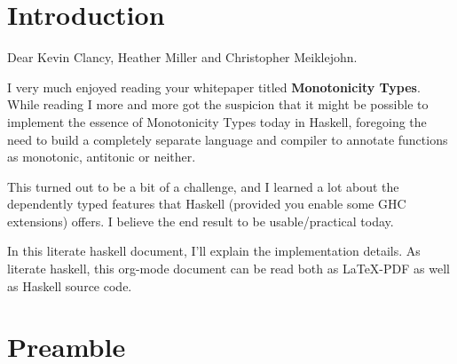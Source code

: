 \documentclass[11pt]{article}
\author{Wiebe-Marten Wijnja}
\date{\today}
\title{}
\begin{document}
\tableofcontents


\section{Introduction}
\label{sec:orgd0d5509}

Dear Kevin Clancy, Heather Miller and Christopher Meiklejohn.

I very much enjoyed reading your whitepaper titled \textbf{Monotonicity Types}.
While reading I more and more got the suspicion that it might be possible to implement the essence of Monotonicity Types today in Haskell,
foregoing the need to build a completely separate language and compiler to annotate functions as monotonic, antitonic or neither.

This turned out to be a bit of a challenge, and I learned a lot about the dependently typed features that Haskell (provided you enable some GHC extensions) offers.
I believe the end result to be usable/practical today.

In this literate haskell document, I'll explain the implementation details.
As literate haskell, this org-mode document can be read both as \LaTeX{}-PDF as well as Haskell source code.


\section{Preamble}
\label{sec:org8bb309f}
\end{document}
